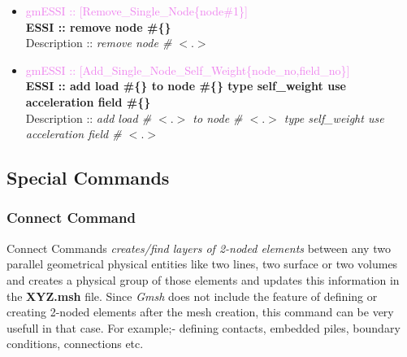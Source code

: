\documentclass[11pt]{article}
\begin{document}
\begin{itemize}
        \item \textcolor{violet} {gmESSI :: [Remove\_Single\_Node\{node\#1\}]}\\
        \textbf{ESSI :: remove node \#\{\}}\\
        Description :: \textit{remove node \# $<.>$}

        \item \textcolor{violet}{ gmESSI :: [Add\_Single\_Node\_Self\_Weight\{node\_no,field\_no\}]}\\
        \textbf{ ESSI :: add load \#\{\} to node \#\{\} type self\_weight use acceleration field \#\{\} }\\
        Description :: \textit{add load \# $<.>$ to node \# $<.>$ type self\_weight use acceleration field \# $<.>$}

  \end{itemize}

\subsection{Special Commands}


\subsubsection{Connect Command} 

Connect Commands \textit{creates/find layers of 2-noded elements} between any
two parallel
geometrical physical entities like two lines, two surface or two volumes and
creates a physical group of those elements and updates this information in the
\textbf{XYZ.msh} file. Since \textit{Gmsh} does not include the feature of
defining or creating 2-noded elements after the mesh creation, this command
can be very usefull in that case. For example;- defining contacts, embedded
piles, boundary conditions, connections etc.
\end{document}
